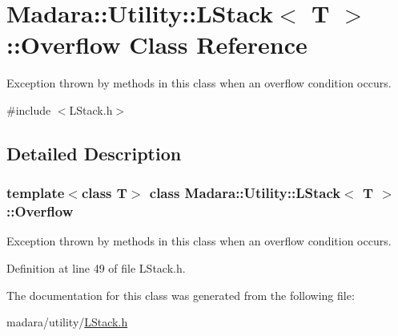 \hypertarget{classMadara_1_1Utility_1_1LStack_1_1Overflow}{
\section{Madara::Utility::LStack$<$ T $>$::Overflow Class Reference}
\label{d0/d4a/classMadara_1_1Utility_1_1LStack_1_1Overflow}
}


Exception thrown by methods in this class when an overflow condition occurs.  




{\ttfamily \#include $<$LStack.h$>$}



\subsection{Detailed Description}
\subsubsection*{template$<$class T$>$ class Madara::Utility::LStack$<$ T $>$::Overflow}

Exception thrown by methods in this class when an overflow condition occurs. 

Definition at line 49 of file LStack.h.



The documentation for this class was generated from the following file:\begin{DoxyCompactItemize}
\item 
madara/utility/\hyperlink{LStack_8h}{LStack.h}\end{DoxyCompactItemize}
